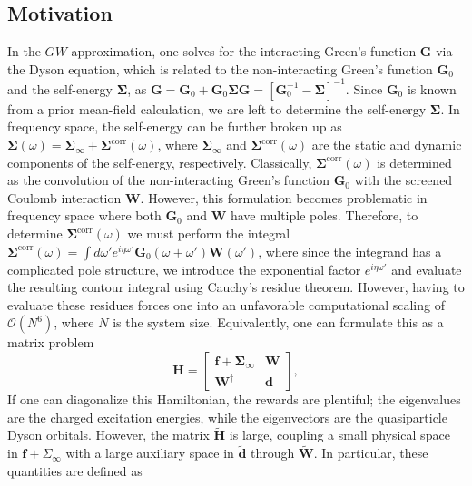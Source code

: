 \documentclass[12pt]{article} %
\begin{document}
\subsection{Motivation}
In the ${GW}$ approximation, one solves for the interacting Green's function $\mathbf{G}$ via the Dyson equation, which is related to the non-interacting Green's function $\mathbf{G}_0$ and the self-energy $\mathbf{\Sigma}$, as $\mathbf{G}=\mathbf{G}_0+\mathbf{G}_0\mathbf{\Sigma}\mathbf{G}=\left[\mathbf{G}_0^{-1}-\mathbf{\Sigma}\right]^{-1}$. Since $\mathbf{G}_0$ is known from a prior mean-field calculation, we are left to determine the self-energy $\mathbf{\Sigma}$. In frequency space, the self-energy can be further broken up as $\mathbf{\Sigma}(\omega)=\mathbf{\Sigma}_{\infty}+\mathbf{\Sigma}^{\text{corr}}(\omega)$, where $\mathbf{\Sigma}_{\infty}$ and $\mathbf{\Sigma}^{\text{corr}}(\omega)$ are the static and dynamic components of the self-energy, respectively. Classically, $\mathbf{\Sigma}^{\text{corr}}(\omega)$ is determined as the convolution of the non-interacting Green's function $\mathbf{G}_0$ with the screened Coulomb interaction $\mathbf{W}$. However, this formulation becomes problematic in frequency space where both $\mathbf{G}_0$ and $\mathbf{W}$ have multiple poles. Therefore, to determine $\mathbf{\Sigma}^{\text{corr}}(\omega)$ we must perform the integral $\mathbf{\Sigma}^{\text{corr}}(\omega)=\int d\omega' e^{i\eta \omega'} \mathbf{G}_0(\omega + \omega')\mathbf{W}(\omega')$, where since the integrand has a complicated pole structure, we introduce the exponential factor $e^{i\eta \omega'}$ and evaluate the resulting contour integral using Cauchy's residue theorem. However, having to evaluate these residues forces one into an unfavorable computational scaling of $\mathcal{O}(N^6)$, where $N$ is the system size. Equivalently, one can formulate this as a matrix problem 
\begin{equation}
    {\mathbf{H}}=\left[\begin{array}{cc}
\mathbf{f}+\boldsymbol{\Sigma}_{\infty} & {\mathbf{W}} \\
{\mathbf{W}}^{\dagger} & {\mathbf{d}}
\end{array}\right],
\end{equation}
If one can diagonalize this Hamiltonian, the rewards are plentiful; the eigenvalues are the charged excitation energies, while the eigenvectors are the quasiparticle Dyson orbitals. However, the matrix $\tilde{\mathbf{H}}$ is large, coupling a small physical space in $\mathbf{f}+\Sigma_{\infty}$ with a large auxiliary space in $\tilde{\mathbf{d}}$ through $\tilde{\mathbf{W}}$. In particular, these quantities are defined as
\end{document}
